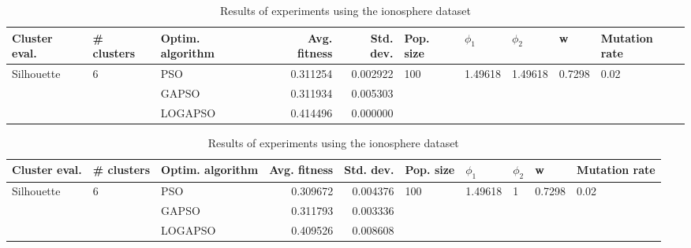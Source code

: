 \documentclass{article}
\begin{document}
\begin{table}
\centering
\caption{Results of experiments using the ionosphere dataset}
\begin{tabular}{lllrrlllll}
\toprule
              Cluster eval. &        \# clusters & Optim. algorithm &  Avg. fitness &  Std. dev. &            Pop. size &               $\phi_{1}$ &               $\phi_{2}$ &                       w &         Mutation rate \\
\midrule
\multirow{3}{*}{Silhouette} & \multirow{3}{*}{6} &              PSO &      0.311254 &   0.002922 & \multirow{3}{*}{100} & \multirow{3}{*}{1.49618} & \multirow{3}{*}{1.49618} & \multirow{3}{*}{0.7298} & \multirow{3}{*}{0.02} \\
                            &                    &            GAPSO &      0.311934 &   0.005303 &                      &                          &                          &                         &                       \\
                            &                    &          LOGAPSO &      0.414496 &   0.000000 &                      &                          &                          &                         &                       \\
\bottomrule
\end{tabular}
\end{table}
\begin{table}
\centering
\caption{Results of experiments using the ionosphere dataset}
\begin{tabular}{lllrrlllll}
\toprule
              Cluster eval. &        \# clusters & Optim. algorithm &  Avg. fitness &  Std. dev. &            Pop. size &               $\phi_{1}$ &         $\phi_{2}$ &                       w &         Mutation rate \\
\midrule
\multirow{3}{*}{Silhouette} & \multirow{3}{*}{6} &              PSO &      0.309672 &   0.004376 & \multirow{3}{*}{100} & \multirow{3}{*}{1.49618} & \multirow{3}{*}{1} & \multirow{3}{*}{0.7298} & \multirow{3}{*}{0.02} \\
                            &                    &            GAPSO &      0.311793 &   0.003336 &                      &                          &                    &                         &                       \\
                            &                    &          LOGAPSO &      0.409526 &   0.008608 &                      &                          &                    &                         &                       \\
\bottomrule
\end{tabular}
\end{table}
\end{document}
